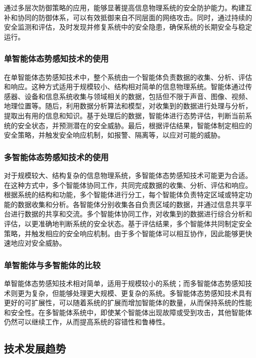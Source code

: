 通过多层次防御策略的应用，能够显著提高信息物理系统的安全防护能力。构建互补和协同的防御体系，可以有效抵御来自不同层面的网络攻击。同时，通过持续的安全监测和评估，及时发现并修复系统中的安全隐患，确保系统的长期安全与稳定运行。

\subsubsection{单智能体态势感知技术的使用}

在单智能体态势感知技术中，整个系统由一个智能体负责数据的收集、分析、评估和响应。这种方式适用于规模较小、结构相对简单的信息物理系统。智能体通过传感器、设备和信息系统收集与领域相关的数据，包括但不限于声音、图像、视频、地理位置等。随后，利用数据分析算法和模型，对收集到的数据进行处理与分析，提取出有用的信息和知识。基于处理后的数据，智能体进行态势评估，判断当前系统的安全状态，并预测潜在的安全威胁。最后，根据评估结果，智能体制定相应的安全策略，并触发安全响应机制，如报警、隔离等，以应对可能的威胁。

\subsubsection{多智能体态势感知技术的使用}

对于规模较大、结构复杂的信息物理系统，多智能体态势感知技术可能更为合适。在这种方式中，多个智能体协同工作，共同完成数据的收集、分析、评估和响应。根据系统的结构和功能，多个智能体进行分工，每个智能体负责特定区域或特定功能的数据收集和分析。各智能体分别收集各自负责区域的数据，并通过信息共享平台进行数据的共享和交流。多个智能体协同工作，对收集到的数据进行综合分析和评估，以更准确地判断系统的安全状态。基于评估结果，多个智能体共同制定安全策略，并触发相应的安全响应机制。由于多个智能体可以相互协作，因此能够更快速地应对安全威胁。

\subsubsection{单智能体与多智能体的比较}

单智能体态势感知技术相对简单，适用于规模较小的系统；而多智能体态势感知技术则更为复杂，但能够处理更大规模、更复杂的系统。多智能体态势感知技术具有更好的可扩展性，可以随着系统的扩展而增加智能体的数量，从而保持系统的性能和安全性。在多智能体系统中，即使某个智能体出现故障或受到攻击，其他智能体仍然可以继续工作，从而提高系统的容错性和鲁棒性。

\subsection{技术发展趋势}

